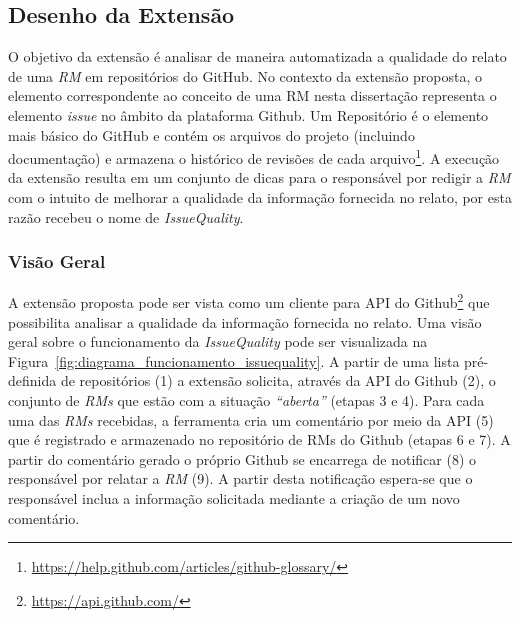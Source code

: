
\subsection{Desenho da Extensão}
\label{sub:desenho_da_extensao}

O objetivo da extensão é analisar de maneira automatizada a qualidade do relato
de uma \textit{RM} em repositórios do GitHub. No contexto da extensão proposta,
o elemento correspondente ao conceito de uma RM nesta dissertação representa o
elemento \textit{issue} no âmbito da plataforma Github. Um Repositório é o
elemento mais básico do GitHub e contém os arquivos do projeto (incluindo
documentação) e armazena o histórico de revisões de cada
arquivo\footnote{\url{https://help.github.com/articles/github-glossary/}}. A
execução da extensão resulta em um conjunto de dicas para o responsável por
redigir a \textit{RM} com o intuito de melhorar a qualidade da informação
fornecida no relato, por esta razão recebeu o nome de \textit{IssueQuality}.

\subsubsection{Visão Geral}
\label{ssub:implementacao_extensao_visao_geral}

A extensão proposta pode ser vista como um cliente para API do
Github\footnote{\url{https://api.github.com/}} que possibilita analisar a
qualidade da informação fornecida no relato. Uma visão geral sobre o
funcionamento da \textit{IssueQuality} pode ser visualizada na
Figura~\ref{fig:diagrama_funcionamento_issuequality}. A partir de uma lista
pré-definida de repositórios (1) a extensão solicita, através da API do Github
(2), o conjunto de \textit{RMs} que estão com a situação \textit{``aberta''}
(etapas 3 e 4). Para cada uma das \textit{RMs} recebidas, a ferramenta cria
um comentário por meio da API (5) que é registrado e armazenado no repositório
de RMs do Github (etapas 6 e 7). A partir do comentário gerado o próprio Github
se encarrega de notificar (8) o responsável por relatar a \textit{RM} (9). A
partir desta notificação espera-se que o responsável inclua a informação
solicitada mediante a criação de um novo comentário.

